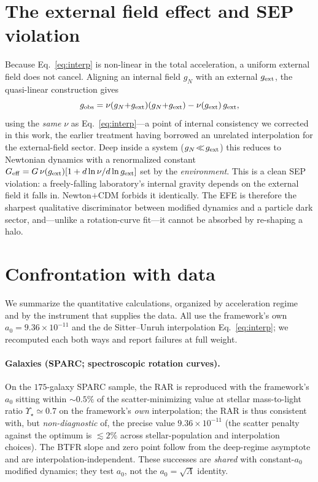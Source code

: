 \documentclass[aps,prd,twocolumn,10pt,nofootinbib,superscriptaddress]{revtex4-2}
\begin{document}
\section{The external field effect and SEP violation}
\label{sec:efe}
Because Eq.~\eqref{eq:interp} is non-linear in the total acceleration, a uniform external field does not cancel.
Aligning an internal field $g_N$ with an external $g_{\rm ext}$, the quasi-linear construction gives
\begin{equation}
g_{\rm obs}=\nu(g_N{+}g_{\rm ext})(g_N{+}g_{\rm ext})-\nu(g_{\rm ext})\,g_{\rm ext},
\label{eq:efe}
\end{equation}
using the \emph{same} $\nu$ as Eq.~\eqref{eq:interp}---a point of internal consistency we corrected in this work,
the earlier treatment having borrowed an unrelated interpolation for the external-field sector. Deep inside a system
($g_N\!\ll\!g_{\rm ext}$) this reduces to Newtonian dynamics with a renormalized constant
$G_{\rm eff}=G\,\nu(g_{\rm ext})[1+d\ln\nu/d\ln g_{\rm ext}]$ set by the \emph{environment}. This is a clean SEP
violation: a freely-falling laboratory's internal gravity depends on the external field it falls in. Newton$+$CDM
forbids it identically. The EFE is therefore the sharpest qualitative discriminator between modified dynamics and a
particle dark sector, and---unlike a rotation-curve fit---it cannot be absorbed by re-shaping a halo.

\section{Confrontation with data}
We summarize the quantitative calculations, organized by acceleration regime and by the instrument that supplies the
data. All use the framework's own $a_0=9.36\times10^{-11}$ and the de Sitter--Unruh interpolation
Eq.~\eqref{eq:interp}; we recomputed each both ways and report failures at full weight.

\paragraph{Galaxies (SPARC; spectroscopic rotation curves).} On the $175$-galaxy SPARC sample, the RAR is reproduced
with the framework's $a_0$ sitting within $\sim0.5\%$ of the scatter-minimizing value at stellar mass-to-light ratio
$\Upsilon_\star\!\simeq\!0.7$ on the framework's \emph{own} interpolation; the RAR is thus consistent with, but
\emph{non-diagnostic} of, the precise value $9.36\times10^{-11}$ (the scatter penalty against the optimum is
$\lesssim2\%$ across stellar-population and interpolation choices). The BTFR slope and zero point follow from the
deep-regime asymptote and are interpolation-independent. These successes are \emph{shared} with constant-$a_0$
modified dynamics; they test $a_0$, not the $a_0\!=\!\sqrt{\Lambda}$ identity.
\end{document}
